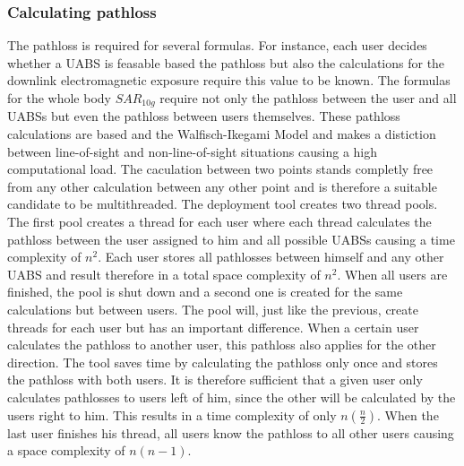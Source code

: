 \subsubsection{Calculating pathloss}
The pathloss is required for several formulas. For instance, each user decides whether a \gls{UABS} is feasable based 
the pathloss but also the calculations for the downlink electromagnetic 
exposure require this value to be known. The formulas for the whole body $SAR_{10g}$ require not only the pathloss between the user
and all \gls{UABS}s but even the pathloss between users themselves. These pathloss calculations are based and the Walfisch-Ikegami 
Model and makes a distiction between line-of-sight and non-line-of-sight situations causing a high computational load. The caculation between two points stands completly free from
any other calculation between any other point and is therefore a suitable candidate to be multithreaded. The deployment tool creates two thread pools.
The first pool creates a thread for each user where each thread calculates the pathloss between the user assigned to him and all possible \gls{UABS}s causing a time complexity of $n^2$.
Each user stores all pathlosses between himself and any other \gls{UABS} and result therefore in a total space complexity of $n^2$.
When all users are finished, the pool is shut down and a second one is created for the same calculations but between users.
The pool will, just like the previous, create threads for each user but has an important difference.
When a certain user calculates the pathloss to another user, this pathloss also applies for the other direction. The tool saves time by calculating the pathloss only 
once and stores the pathloss with both users. It is therefore sufficient that a given user only calculates pathlosses to users left of him, since the other will 
be calculated by the users right to him. This results in a time complexity of only $n(\frac{n}{2})$. When the last user finishes his thread, all users know the pathloss to all other users causing 
a space complexity of $n(n-1)$.

